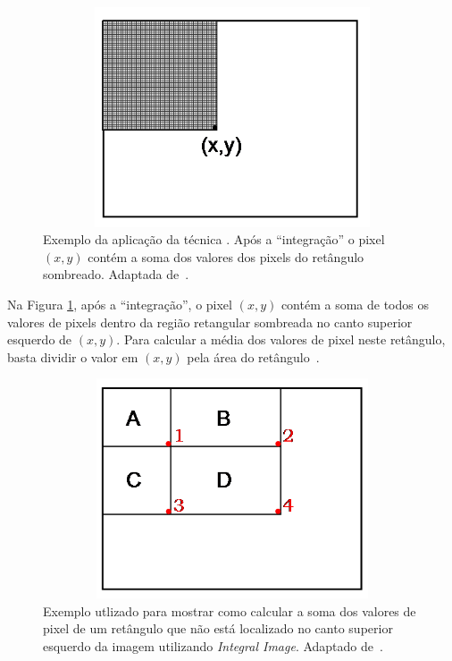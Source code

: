 	\begin{figure}[hbt]
		\begin{center}
			\includegraphics[height=6.5cm,width=12.5cm]{figuras/2.FundamentacaoTeorica/integral_image.png}
		\end{center}
		\caption{Exemplo da aplicação da técnica . Após a ``integração'' o pixel $\displaystyle (x,y)$ contém a soma dos valores dos pixels do retângulo sombreado. Adaptada de~\cite{servodetection}.}
		\label{integralimage}
	\end{figure}

Na Figura \ref{integralimage}, após a ``integração'', o pixel $\displaystyle (x,y)$ contém a soma de todos os valores de pixels dentro da região retangular sombreada no canto superior esquerdo de $\displaystyle (x,y)$. Para calcular a média dos valores de pixel neste retângulo, basta dividir o valor em $\displaystyle (x,y)$ pela área do retângulo~\cite{servodetection}.

	\begin{figure}[hbt]
		\begin{center}
			\includegraphics[height=6.5cm,width=12.5cm]{figuras/2.FundamentacaoTeorica/integral_image2.png}
		\end{center}
		\caption{Exemplo utlizado para mostrar como calcular a soma dos valores de pixel de um retângulo que não está localizado no canto superior esquerdo da imagem utilizando \textit{Integral Image}. Adaptado de~\cite{servodetection}.}
		\label{integralimage2}
	\end{figure}

